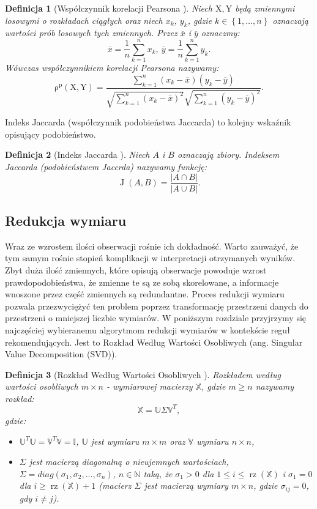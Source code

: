\documentclass[12pt,a4paper]{report}
\newtheorem{df}{Definicja}[chapter]
\newcommand{\set}[1]{\left\lbrace {#1} \right\rbrace}
\newcommand{\setN}{\mathbb{N}}
\newcommand{\rop}[2]{\operatorname{\rho^p}\left( {#1},{#2} \right)}
\newcommand{\J}[2]{\operatorname{J}\left({#1}, {#2} \right)}
\newcommand{\rz}[1]{\operatorname{rz}\left({#1} \right)}
\begin{document}
\begin{df}[Współczynnik korelacji Pearsona \citep{rsh}]

Niech $\mathrm{X},\mathrm{Y}$ będą zmiennymi losowymi o rozkładach ciągłych oraz niech $x_k$, $y_k$, gdzie $k\in\set{1, \ldots, n}$  oznaczają wartości prób losowych tych zmiennych. 
Przez $\overline{x}$ i $\overline{y}$ oznaczmy:
$$
\overline{x}=\frac{1}{n} \sum_{k=1}^n x_k, \: \overline{y}=\frac{1}{n} \sum_{k=1}^n y_k.
$$
Wówczas współczynnikiem korelacji Pearsona nazywamy:
$$
\rop{\mathrm{X}}{\mathrm{Y}} = \frac{\sum_{k=1}^n(x_k - \overline{x})(y_k - \overline{y})}{\sqrt{\sum_{k=1}^n(x_k - \overline{x})^2} \sqrt{\sum_{k=1}^n(y_k - \overline{y})^2 }}.
$$
\end{df}

Indeks Jaccarda (współczynnik podobieństwa Jaccarda) to kolejny wskaźnik opisujący podobieństwo. 
\begin{df}[Indeks Jaccarda  \citep{bre}]
Niech $\mathit{A}$ i $\mathit{B}$ oznaczają zbiory. Indeksem Jaccarda (podobieństwem Jaccrda) nazywamy funkcję:
$$
\J{\mathit{A}}{\mathit{B}}=\frac{|\mathit{A}\cap \mathit{B}|}{|\mathit{A} \cup \mathit{B}|}.
$$
\end{df}

\subsection{Redukcja wymiaru}
Wraz ze wzrostem ilości obserwacji rośnie ich dokładność. Warto zauważyć, że tym samym rośnie stopień komplikacji w interpretacji otrzymanych wyników. Zbyt duża ilość zmiennych, które opisują obserwacje powoduje wzrost prawdopodobieństwa, że zmienne te są ze sobą skorelowane, a informacje wnoszone przez część zmiennych są redundantne. Proces redukcji wymiaru pozwala przezwyciężyć ten problem poprzez transformację przestrzeni danych do przestrzeni o mniejszej liczbie wymiarów. W poniższym rozdziale przyjrzymy się najczęściej wybieranemu algorytmom redukcji wymiarów w kontekście reguł rekomendujących. Jest to Rozkład Według Wartości Osobliwych (ang. Singular Value Decomposition (SVD)).

\begin{df} [Rozkład Według Wartości Osobliwych {\citep{ulafiir}}]%
Rozkładem według wartości osobliwych $m\times n$ - wymiarowej macierzy $\mathbb{X}$, gdzie $m\geq n$ nazywamy rozkład:
$$
\mathbb{X}=\mathbb{U} \Sigma \mathbb{V}^T,
$$
gdzie:
\begin{itemize}
\item $\mathbb{U}^T \mathbb{U} = \mathbb{V}^T \mathbb{V} = \mathbb{I}$, $\mathbb{U}$ jest wymiaru $m \times m$ oraz $\mathbb{V}$ wymiaru $n \times n$,
\item $\Sigma$ jest macierzą diagonalną o nieujemnych wartościach, $\Sigma = diag(\sigma_1, \sigma_2,..., \sigma_n)$, $n \in \setN$ taką, że $\sigma_1>0$ dla $1\leq i \leq \rz{\mathbb{X}}$ i $\sigma_1=0$ dla $i\geq \rz{\mathbb{X}}+1$ (macierz $\Sigma$ jest macierzą wymiary $m \times n$, gdzie $\sigma_{ij} = 0$, gdy $i \neq j$).	
\end{itemize}
\end{df}
\end{document}
